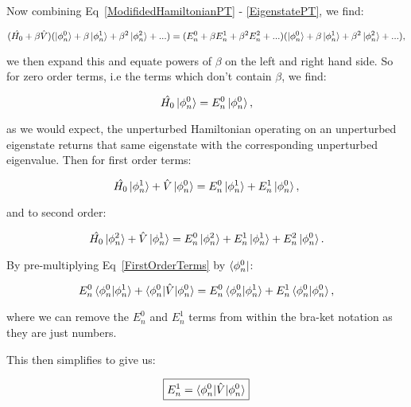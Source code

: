 \noindent Now combining Eq~\ref{ModifidedHamiltonianPT} - \ref{EigenstatePT}, we find:

\begin{equation}
    (\Hat{H_0} + \beta \Hat{V})(\ket{\phi^0_n} + \beta \ket{\phi^1_n} + \beta^2 \ket{\phi^2_n} + ...) = (E^0_n + \beta E^1_n + \beta^2 E^2_n + ...)(\ket{\phi^0_n} + \beta \ket{\phi^1_n} + \beta^2 \ket{\phi^2_n} + ...),
    \label{ExpandedHamiltonian}
\end{equation}

\noindent we then expand this and equate powers of $\beta$ on the left and right hand side. So for zero order terms, i.e the terms which don't contain $\beta$, we find:

\begin{equation}
    \Hat{H_0} \ket{\phi^0_n} = E^0_n \ket{\phi^0_n},
    \label{ZeroOrderTerms}
\end{equation}

\noindent as we would expect, the unperturbed Hamiltonian operating on an unperturbed eigenstate returns that same eigenstate with the corresponding unperturbed eigenvalue. Then for first order terms:

\begin{equation}
    \Hat{H_0} \ket{\phi^1_n} + \Hat{V} \ket{\phi^0_n} = E^0_n \ket{\phi^1_n} + E^1_n \ket{\phi^0_n},
    \label{FirstOrderTerms}
\end{equation}

\noindent and to second order:

\begin{equation}
    \Hat{H_0} \ket{\phi^2_n} + \Hat{V} \ket{\phi^1_n} = E^0_n \ket{\phi^2_n} + E^1_n \ket{\phi^1_n} + E^2_n \ket{\phi^0_n}.
    \label{SecondOrderTerms}
\end{equation}

\noindent By pre-multiplying Eq~\ref{FirstOrderTerms} by $\bra{\phi^0_n}$:

\begin{equation}
    E^0_n \braket{\phi^0_n | \phi^1_n} + \braket{\phi^0_n | \Hat{V} | \phi^0_n} = E^0_n \braket{\phi^0_n | \phi^1_n} + E^1_n \braket{\phi^0_n | \phi^0_n},
    \label{FirstOrderMultiplied}
\end{equation}

\noindent where we can remove the $E^0_n$ and $E^1_n$ terms from within the bra-ket notation as they are just numbers.

\noindent This then simplifies to give us:

\begin{equation}
    \boxed{E^1_n = \braket{\phi^0_n | \Hat{V} | \phi^0_n}}
    \label{FirstOrderEnergyCorrection}
\end{equation}

